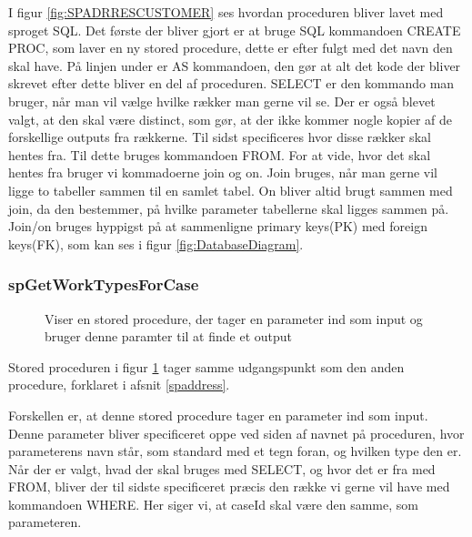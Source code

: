 I figur \ref{fig:SPADRRESCUSTOMER} ses hvordan proceduren bliver lavet med sproget SQL. Det første der bliver gjort er at bruge SQL kommandoen CREATE PROC, som laver en ny stored procedure, dette er efter fulgt med det navn den skal have.
På linjen under er AS kommandoen, den gør at alt det kode der bliver skrevet efter dette bliver en del af proceduren.
SELECT er den kommando man bruger, når man vil vælge hvilke rækker man gerne vil se.
Der er også blevet valgt, at den skal være distinct, som gør, at der ikke kommer nogle kopier af de forskellige outputs fra rækkerne.
Til sidst specificeres hvor disse rækker skal hentes fra.
Til dette bruges kommandoen FROM.
For at vide, hvor det skal hentes fra bruger vi kommadoerne join og on.
Join bruges, når man gerne vil ligge to tabeller sammen til en samlet tabel.
On bliver altid brugt sammen med join, da den bestemmer, på hvilke parameter tabellerne skal ligges sammen på.
Join/on bruges hyppigst på at sammenligne primary keys(PK) med foreign keys(FK), som kan ses i figur \ref{fig:DatabaseDiagram}.

\subsubsection{spGetWorkTypesForCase}
\begin{figure}[H]
    \caption{Viser en stored procedure, der tager en parameter ind som input og bruger denne paramter til at finde et output}
    \label{fig:SPWORKTYPE}
\end{figure}

Stored proceduren i figur \ref{fig:SPWORKTYPE} tager samme udgangspunkt som den anden procedure, forklaret i afsnit \ref{spaddress}.

Forskellen er, at denne stored procedure tager en parameter ind som input.
Denne parameter bliver specificeret oppe ved siden af navnet på proceduren, hvor parameterens navn står, som standard med et \@ tegn foran, og hvilken type den er.
Når der er valgt, hvad der skal bruges med SELECT, og hvor det er fra med FROM, bliver der til sidste specificeret præcis den række vi gerne vil have med kommandoen WHERE.
Her siger vi, at caseId skal være den samme, som parameteren.


